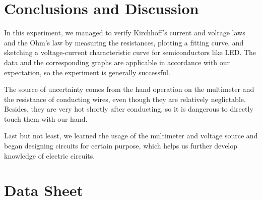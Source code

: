 \documentclass[a4paper]{report}
\begin{document}
	\section{Conclusions and Discussion}
	In this experiment, we managed to verify Kirchhoff's current and voltage laws and the Ohm's law by measuring the resistances, plotting a fitting curve, and sketching a voltage-current characteristic curve for semiconductors like LED. The data and the corresponding graphs are applicable in accordance with our expectation, so the experiment is generally successful.
	
	The source of uncertainty comes from the hand operation on the multimeter and the resistance of conducting wires, even though they are relatively neglictable. Besides, they are very hot shortly after conducting, so it is dangerous to directly touch them with our hand.
	
	Last but not least, we learned the usage of the multimeter and voltage source and began designing circuits for certain purpose, which helps us further develop knowledge of electric circuits.
	\vspace{15cm}
	\section*{Data Sheet}
\end{document}
